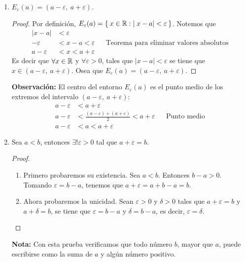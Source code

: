 \begin{enumerate}[label=\alph*)]
  
  \item $E_\varepsilon(a) = (a-\varepsilon, \ a+\varepsilon)$.
  
  \begin{proof}\leavevmode
    Por definición, $E_\varepsilon(a) = \Set{x\in \mathbb{R}: |x-a|<\varepsilon}$. Notemos que
    \begin{align*}
      |x - a | &< \varepsilon\\
      -\varepsilon &< x-a < \varepsilon && \text{Teorema para eliminar valores absolutos}\\
      a -\varepsilon &< x < a+ \varepsilon
    \end{align*}
    Es decir que $\forall x\in \mathbb{R}$ y $\forall \varepsilon>0$, tales que $|x-a|<\varepsilon$ se tiene que $x\in (a-\varepsilon, \ a+ \varepsilon)$. Osea que $E_\varepsilon(a) = (a-\varepsilon, \ a+\varepsilon)$.
  \end{proof}
  \textbf{Observación:} El centro del entorno $E_\varepsilon(a)$ es el punto medio de los extremos del intervalo $(a-\varepsilon, \ a+\varepsilon)$:
  \begin{align*}
    a - \varepsilon &< a + \varepsilon\\
    a- \varepsilon &< \frac{(a - \varepsilon)+(a + \varepsilon)}{2} < a + \varepsilon && \text{Punto medio}\\
    a- \varepsilon &< a < a + \varepsilon
  \end{align*}
  
  \item Sea $a<b$, entonces $\exists! \varepsilon>0$ tal que $a+\varepsilon=b$.
 \begin{proof}\leavevmode
  \begin{enumerate}[label=\roman*)]
    \item Primero probaremos su existencia. Sea $a<b$. Entonces $b-a>0$. Tomando $\varepsilon=b-a$, tenemos que $a+\varepsilon=a+b-a=b$.
    \item Ahora probaremos la unicidad. Sean $\varepsilon>0$ y $\delta>0$ tales que $a+\varepsilon=b$ y $a+\delta=b$, se tiene que $\varepsilon=b-a$ y $\delta=b-a$, es decir, $\varepsilon=\delta$. \qedhere
  \end{enumerate}
 \end{proof}
 
 \textbf{Nota:} Con esta prueba verificamos que todo número $b$, mayor que $a$, puede escribirse como la suma de $a$ y algún número positivo.
 

\end{enumerate}
